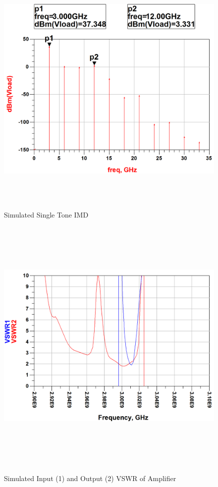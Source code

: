 \begin{figure}
  \centering
  \includegraphics[width=5in,height=5in,keepaspectratio]{figures/amp_sim/IMD_singletone}\\
  \caption{Simulated Single Tone IMD}
  \label{fig:imd_single}

  \vspace*{\floatsep}

  \centering
  \includegraphics[width=5in,height=5in,keepaspectratio]{figures/amp_sim/vswr}\\
  \caption{Simulated Input (1) and Output (2) VSWR of Amplifier}
  \label{fig:amp_sim_vswr}


\end{figure}
